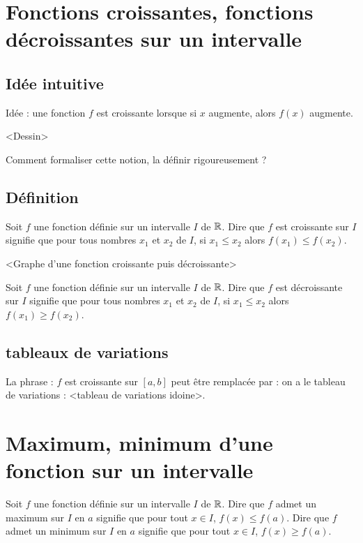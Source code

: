 \documentclass[a4paper,11pt,DIV18,BCOR0mm]{scrartcl}
\begin{document}
\section{Fonctions croissantes, fonctions décroissantes sur un intervalle}
\subsection{Idée intuitive}
Idée : une fonction $f$ est croissante lorsque
si $x$ augmente, alors $f(x)$ augmente.

<Dessin>

Comment formaliser cette notion, la définir rigoureusement ?
\subsection{Définition}
\begin{definition}
Soit $f$ une fonction définie sur un intervalle $I$ de $\mathbb{R}$.
Dire que $f$ est croissante sur $I$ signifie que pour
tous nombres $x_1$ et $x_2$ de $I$,
si $x_1\leq x_2$ alors $f(x_1)\leq f(x_2)$.
\end{definition}

\begin{exemple}
<Graphe d'une fonction croissante puis décroissante>
\end{exemple}

\begin{definition}
Soit $f$ une fonction définie sur un intervalle $I$ de $\mathbb{R}$.
Dire que $f$ est décroissante sur $I$ signifie que pour
tous nombres $x_1$ et $x_2$ de $I$,
si $x_1\leq x_2$ alors $f(x_1)\geq f(x_2)$.
\end{definition}

\subsection{tableaux de variations}

La phrase : \og $f$ est croissante sur $[a,b]$\fg{}
peut être remplacée par : on a le tableau de variations :
<tableau de variations idoine>.


\section{Maximum, minimum d'une fonction sur un intervalle}
\begin{definition}
Soit $f$ une fonction définie sur un intervalle $I$ de $\mathbb{R}$.
Dire que $f$ admet un maximum sur $I$ en $a$ signifie que
pour tout $x\in I$, $f(x)\leq f(a)$.
Dire que $f$ admet un minimum sur $I$ en $a$ signifie que
pour tout $x\in I$, $f(x)\geq f(a)$.
\end{definition}
\end{document}
